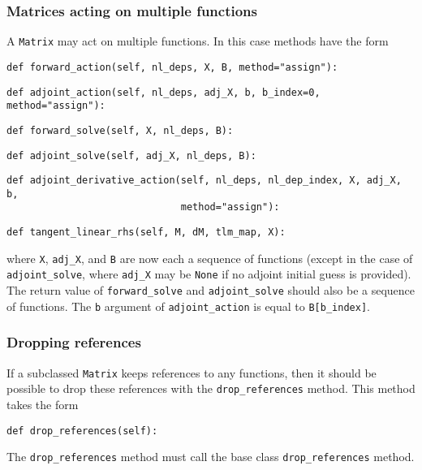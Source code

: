 \documentclass[11pt]{article}
\begin{document}
\subsubsection{Matrices acting on multiple functions}\label{sect:Matrix_multiple}

A \texttt{Matrix} may act on multiple functions. In this case methods have the
form
\begin{lstlisting}
def forward_action(self, nl_deps, X, B, method="assign"):
\end{lstlisting}
\begin{lstlisting}
def adjoint_action(self, nl_deps, adj_X, b, b_index=0, method="assign"):
\end{lstlisting}
\begin{lstlisting}
def forward_solve(self, X, nl_deps, B):
\end{lstlisting}
\begin{lstlisting}
def adjoint_solve(self, adj_X, nl_deps, B):
\end{lstlisting}
\begin{lstlisting}
def adjoint_derivative_action(self, nl_deps, nl_dep_index, X, adj_X, b,
                              method="assign"):
\end{lstlisting}
\begin{lstlisting}
def tangent_linear_rhs(self, M, dM, tlm_map, X):
\end{lstlisting}
where \texttt{X}, \texttt{adj\_X}, and \texttt{B} are now each a sequence of
functions (except in the case of \texttt{adjoint\_solve}, where \texttt{adj\_X}
may be \texttt{None} if no adjoint initial guess is provided). The return value
of \texttt{forward\_solve} and \texttt{adjoint\_solve} should also be a
sequence of functions. The \texttt{b} argument of \texttt{adjoint\_action} is
equal to \texttt{B[b\_index]}.

\subsubsection{Dropping references}

If a subclassed \texttt{Matrix} keeps references to any functions, then it
should be possible to drop these references with the \texttt{drop\_references}
method. This method takes the form
\begin{lstlisting}
def drop_references(self):
\end{lstlisting}
The \texttt{drop\_references} method must call the base class
\texttt{drop\_references} method.
\end{document}
